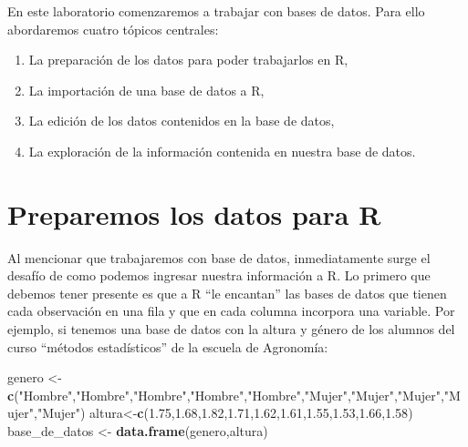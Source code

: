 \documentclass[]{book}
\newenvironment{Shaded}{\begin{snugshade}}{\end{snugshade}}
\newcommand{\FloatTok}[1]{\textcolor[rgb]{0.00,0.00,0.81}{#1}}
\newcommand{\KeywordTok}[1]{\textcolor[rgb]{0.13,0.29,0.53}{\textbf{#1}}}
\newcommand{\NormalTok}[1]{#1}
\newcommand{\StringTok}[1]{\textcolor[rgb]{0.31,0.60,0.02}{#1}}
\providecommand{\tightlist}{%
  \setlength{\itemsep}{0pt}\setlength{\parskip}{0pt}}
\begin{document}
En este laboratorio comenzaremos a trabajar con bases de datos. Para ello abordaremos cuatro tópicos centrales:

\begin{enumerate}
\def\labelenumi{\arabic{enumi}.}
\tightlist
\item
  La preparación de los datos para poder trabajarlos en R,
\item
  La importación de una base de datos a R,
\item
  La edición de los datos contenidos en la base de datos,
\item
  La exploración de la información contenida en nuestra base de datos.
\end{enumerate}

\hypertarget{preparemos-los-datos-para-r}{%
\section{Preparemos los datos para R}\label{preparemos-los-datos-para-r}}

Al mencionar que trabajaremos con base de datos, inmediatamente surge el desafío de como podemos ingresar nuestra información a R. Lo primero que debemos tener presente es que a R ``le encantan'' las bases de datos que tienen cada observación en una fila y que en cada columna incorpora una variable. Por ejemplo, si tenemos una base de datos con la altura y género de los alumnos del curso ``métodos estadísticos'' de la escuela de Agronomía:

\begin{Shaded}
\begin{Highlighting}[]
\NormalTok{genero <-}\StringTok{ }\KeywordTok{c}\NormalTok{(}\StringTok{"Hombre"}\NormalTok{,}\StringTok{"Hombre"}\NormalTok{,}\StringTok{"Hombre"}\NormalTok{,}\StringTok{"Hombre"}\NormalTok{,}\StringTok{"Hombre"}\NormalTok{,}\StringTok{"Mujer"}\NormalTok{,}\StringTok{"Mujer"}\NormalTok{,}\StringTok{"Mujer"}\NormalTok{,}\StringTok{"Mujer"}\NormalTok{,}\StringTok{"Mujer"}\NormalTok{)}
\NormalTok{altura<-}\KeywordTok{c}\NormalTok{(}\FloatTok{1.75}\NormalTok{,}\FloatTok{1.68}\NormalTok{,}\FloatTok{1.82}\NormalTok{,}\FloatTok{1.71}\NormalTok{,}\FloatTok{1.62}\NormalTok{,}\FloatTok{1.61}\NormalTok{,}\FloatTok{1.55}\NormalTok{,}\FloatTok{1.53}\NormalTok{,}\FloatTok{1.66}\NormalTok{,}\FloatTok{1.58}\NormalTok{)}
\NormalTok{base_de_datos <-}\StringTok{ }\KeywordTok{data.frame}\NormalTok{(genero,altura)}
\end{Highlighting}
\end{Shaded}
\end{document}
